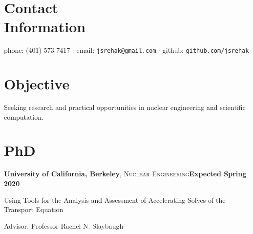 \documentclass[margin,line]{resume}
\begin{document}
\begin{resume}
  \section{\mysidestyle Contact\\Information}
  phone: (401) 573-7417 $\cdot$ email: \verb`jsrehak@gmail.com`
  $\cdot$ github: \verb`github.com/jsrehak`\hfill \\

    \section{\mysidestyle Objective}
                Seeking research and practical opportunities in nuclear engineering and scientific computation.%
    \section{\mysidestyle PhD}
    \textbf{University of California, Berkeley}, \textsc{Nuclear
      Engineering}\hfill \textbf{Expected Spring 2020}\vspace{-3mm}\\\vspace{-1mm}%
    \begin{list2}
        \item[] Using Tools for the Analysis and Assessment of Accelerating Solves of the Transport Equation
        \item[] Advisor:  Professor Rachel N. Slaybaugh
    \end{list2}\vspace{-1.5mm}

\end{resume}
\end{document}
